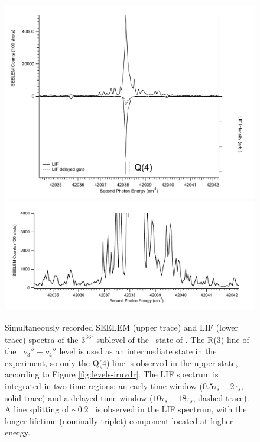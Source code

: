 \documentclass[12pt]{mitthesis}
\begin{document}
\begin{figure}
  \caption{Simultaneously recorded SEELEM (upper trace) and LIF (lower
    trace) spectra of the $3^36^1$  sublevel of the \astate\
    state of .  The R(3) line of the \xstate\ $\nu_3'' +
    \nu_4''$ level is used as an intermediate state in the experiment,
    so only the Q(4) line is observed in the upper state, according to
    Figure \ref{fig:levels-iruvdr}.  The LIF spectrum is integrated in
    two time regions: an early time window ($0.5\tau_s-2\tau_s$, solid
    trace) and a delayed time window ($10\tau_s-18\tau_s$, dashed
    trace).  A line splitting of $\sim0.2$ \rcm\ is observed in the LIF
    spectrum, with the longer-lifetime (nominally triplet) component
    located at higher energy.}
  \label{fig:3361-q4}
  \centering
  \includegraphics[width=6in]{spectrum-3361-q4-split.pdf}
  \includegraphics[width=6in]{spectrum-3361-q4-zoom.pdf}
\end{figure}
\end{document}
